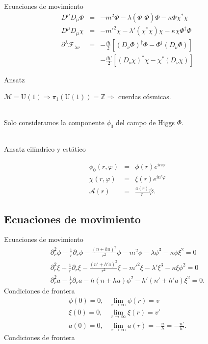 \documentclass[14pt]{beamer}
\begin{document}
\begin{frame}{Ecuaciones de movimiento}
\begin{eqnarray*}
	D^{\mu}D_{\mu} \Phi & = & -m^2 \Phi - \lambda (\Phi^{\dagger}\Phi)\Phi - \kappa \Phi \chi^* \chi \\
	D^{\mu}D_{\mu} \chi & = & -m'^2 \chi - \lambda' (\chi^{*}\chi)\chi - \kappa \chi \Phi^{\dagger} \Phi \\
	\partial^{\lambda}\mathcal{F}_{\lambda\nu}  & = & -\frac{ih}{2}\left[ (D_{\nu}\Phi)^{\dagger}\Phi-\Phi^{\dagger}(D_{\nu}\Phi)\right] \\
	& & - \frac{ih'}{2}\left[ (D_{\nu}\chi)^{*}\chi-\chi^{*}(D_{\nu}\chi)\right]
\end{eqnarray*}
\end{frame}

\begin{frame}{Ansatz}

$\mathcal{M} = \text{U}(1) \Rightarrow \pi_1(\text{U}(1)) = \mathbb{Z} \Rightarrow$ cuerdas cósmicas. \\~\

Solo consideramos la componente $\phi_0$ del campo de Higgs $\Phi$. \\~\

Ansatz cilíndrico y estático

\begin{eqnarray*}
	\phi_0(r,\varphi) & = & \phi(r) e^{in\varphi} \\
	\chi(r,\varphi) & = & \xi(r) e^{in'\varphi} \\
	\mathbf{\mathcal{A}}(r) & = & \frac{a(r)}{r} \hat{\varphi}.
\end{eqnarray*}

\end{frame}
\subsection{Ecuaciones de movimiento}
\begin{frame}{Ecuaciones de movimiento}
\begin{eqnarray*}
\partial_r^2 \phi + \frac{1}{r} \partial_r \phi- \frac{\left(n+ha\right)^2}{r^2}\phi- m^2 \phi- \lambda \phi^3-\kappa \phi \xi^2 = 0 \\
\partial_r^2 \xi + \frac{1}{r} \partial_r \xi - \frac{\left(n'+h'a\right)^2}{r^2}\xi -m'^2\xi - \lambda' \xi^3 -\kappa \xi \phi^2 = 0\\
\partial_r^2a -\frac{1}{r}\partial_r a-h(n+ha)\phi^2-h'(n' + h'a )\xi^2 = 0.
\end{eqnarray*}
Condiciones de frontera
\begin{eqnarray*}
	\phi(0)=0, & \displaystyle\lim_{r\to\infty}\phi(r) = v \\
	 \xi(0)=0, &  \displaystyle\lim_{r\to\infty}\xi(r) = v' \\
	 a(0)=0, & \displaystyle \lim_{r\to\infty}a(r) = -\frac{n}{h}=-\frac{n'}{h'} .
\end{eqnarray*}
Condiciones de frontera
\end{frame}
\end{document}
